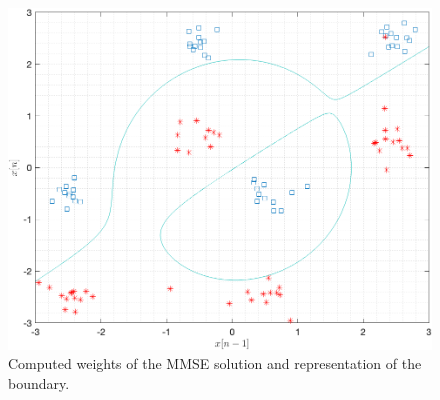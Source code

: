 \documentclass[11pt]{article}
\begin{document}
\begin{figure}[h!]
    \centering
    \includegraphics[width=\textwidth]{figure02.png}
    \vspace{1em}\caption{Computed weights of the MMSE solution and representation of the boundary.}
    \label{fig:figure02}
\end{figure}
\end{document}
